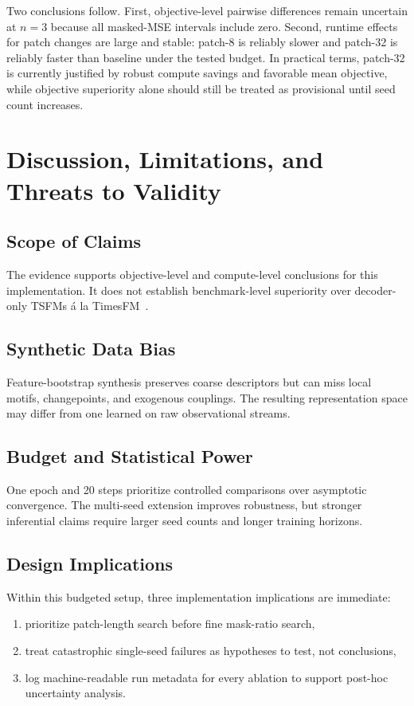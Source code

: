 \documentclass[conference]{IEEEtran}
\begin{document}
Two conclusions follow. First, objective-level pairwise differences remain uncertain at $n=3$ because all masked-MSE intervals include zero. Second, runtime effects for patch changes are large and stable: patch-8 is reliably slower and patch-32 is reliably faster than baseline under the tested budget. In practical terms, patch-32 is currently justified by robust compute savings and favorable mean objective, while objective superiority alone should still be treated as provisional until seed count increases.

\section{Discussion, Limitations, and Threats to Validity}
\subsection{Scope of Claims}
The evidence supports objective-level and compute-level conclusions for this implementation. It does not establish benchmark-level superiority over decoder-only TSFMs \'a la TimesFM \,\cite{timesfm,gruver2023llmtime}.

\subsection{Synthetic Data Bias}
Feature-bootstrap synthesis preserves coarse descriptors but can miss local motifs, changepoints, and exogenous couplings. The resulting representation space may differ from one learned on raw observational streams.

\subsection{Budget and Statistical Power}
One epoch and 20 steps prioritize controlled comparisons over asymptotic convergence. The multi-seed extension improves robustness, but stronger inferential claims require larger seed counts and longer training horizons.

\subsection{Design Implications}
Within this budgeted setup, three implementation implications are immediate:
\begin{enumerate}
    \item prioritize patch-length search before fine mask-ratio search,
    \item treat catastrophic single-seed failures as hypotheses to test, not conclusions,
    \item log machine-readable run metadata for every ablation to support post-hoc uncertainty analysis.
\end{enumerate}
\end{document}
